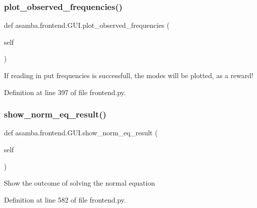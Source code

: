 \subsubsection{\texorpdfstring{plot\+\_\+observed\+\_\+frequencies()}{plot\_observed\_frequencies()}}
{\footnotesize\ttfamily def asamba.\+frontend.\+G\+U\+I.\+plot\+\_\+observed\+\_\+frequencies (\begin{DoxyParamCaption}\item[{}]{self }\end{DoxyParamCaption})}

\begin{DoxyVerb}If reading in put frequencies is successfull, the modes will be plotted, as a reward! \end{DoxyVerb}
 

Definition at line 397 of file frontend.\+py.

\mbox{\label{classasamba_1_1frontend_1_1_g_u_i_a863beb8817b0f728771fcb3323afb043}} 
\subsubsection{\texorpdfstring{show\+\_\+norm\+\_\+eq\+\_\+result()}{show\_norm\_eq\_result()}}
{\footnotesize\ttfamily def asamba.\+frontend.\+G\+U\+I.\+show\+\_\+norm\+\_\+eq\+\_\+result (\begin{DoxyParamCaption}\item[{}]{self }\end{DoxyParamCaption})}

\begin{DoxyVerb}Show the outcome of solving the normal equation \end{DoxyVerb}
 

Definition at line 582 of file frontend.\+py.

\mbox{\label{classasamba_1_1frontend_1_1_g_u_i_a2f99fe1402d07c15d79897c8ec0ee4e0}} 
